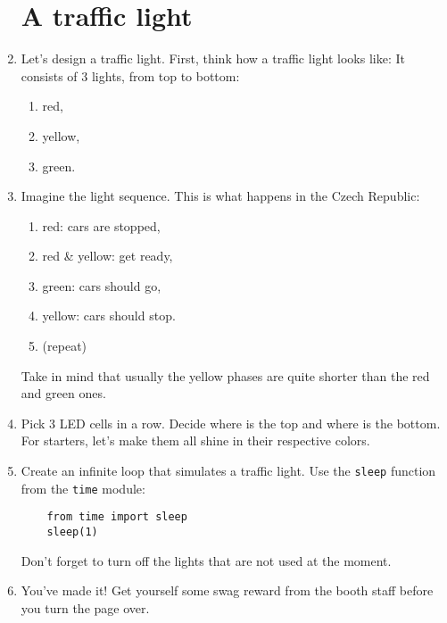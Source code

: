 \documentclass{../tutorial}
\begin{document}
\begin{enumerate}
\section{A traffic light}

\item
    Let's design a traffic light.
    First, think how a traffic light looks like:
    It consists of 3 lights, from top to bottom:

    \begin{enumerate}
    \item red,
    \item yellow,
    \item green.
    \end{enumerate}

\item
    Imagine the light sequence. This is what happens in the Czech Republic:

    \begin{enumerate}
    \item red: cars are stopped,
    \item red \& yellow: get ready,
    \item green: cars should go,
    \item yellow: cars should stop.
    \item (repeat)
    \end{enumerate}

    Take in mind that usually the yellow phases are quite shorter than the red and green ones.

\item
    Pick 3 LED cells in a row.
    Decide where is the top and where is the bottom.
    For starters, let's make them all shine in their respective colors.

\item
    Create an infinite loop that simulates a traffic light.
    Use the \lstinline|sleep| function from the \lstinline|time| module:

    \begin{lstlisting}
    from time import sleep
    sleep(1)
    \end{lstlisting}

    Don't forget to turn off the lights that are not used at the moment.

\item
    You've made it!
    Get yourself some swag reward from the booth staff before you turn the page over.

\clearpage


\end{enumerate}
\end{document}
